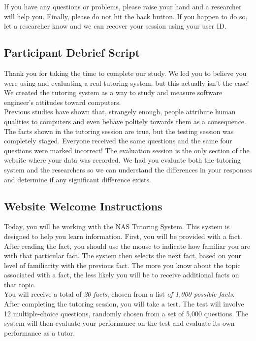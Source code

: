 \documentclass{sig-alternate-05-2015}
\begin{document}
{\noindent If you have any questions or problems, please raise your hand and a researcher will help you. Finally, please do not hit the back button. If you happen to do so, let a researcher know and we can recover your session using your user ID.

\subsection{Participant Debrief Script}

\noindent Thank you for taking the time to complete our study. We led you to believe you were using and evaluating a real tutoring system, but this actually isn't the case! We created the tutoring system as a way to study and measure software engineer's attitudes toward computers.\\

\noindent Previous studies have shown that, strangely enough, people attribute human qualities to computers and even behave politely towards them as a consequence. The facts shown in the tutoring session are true, but the testing session was completely staged. Everyone received the same questions and the same four questions were marked incorrect! The evaluation session is the only section of the website where your data was recorded. We had you evaluate both the tutoring system and the researchers so we can understand the differences in your responses and determine if any significant difference exists. 

\subsection{Website Welcome Instructions}
\noindent Today, you will be working with the NAS Tutoring System. This system is designed to help you learn information. First, you will be provided with a fact. After reading the fact, you should use the mouse to indicate how familiar you are with that particular fact. The system then selects the next fact, based on your level of familiarity with the previous fact. The more you know about the topic associated with a fact, the less likely you will be to receive additional facts on that topic.\\
				
\noindent You will receive a total of \emph{20 facts}, chosen from a list \emph{of 1,000 possible facts}. After completing the tutoring session, you will take a test. The test will involve 12 multiple-choice questions, randomly chosen from a set of 5,000 questions. The system will then evaluate your performance on the test and evaluate its own performance as a tutor.

}
\end{document}
